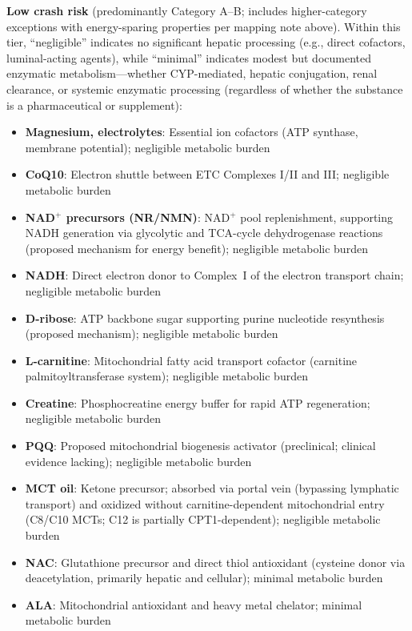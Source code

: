 \textbf{Low crash risk} (predominantly Category A--B; includes higher-category exceptions with energy-sparing properties per mapping note above). Within this tier, ``negligible'' indicates no significant hepatic processing (e.g., direct cofactors, luminal-acting agents), while ``minimal'' indicates modest but documented enzymatic metabolism---whether CYP-mediated, hepatic conjugation, renal clearance, or systemic enzymatic processing (regardless of whether the substance is a pharmaceutical or supplement):
\begin{itemize}
    \item \textbf{Magnesium, electrolytes}: Essential ion cofactors (ATP synthase, membrane potential); negligible metabolic burden
    \item \textbf{CoQ10}: Electron shuttle between ETC Complexes I/II and III; negligible metabolic burden
    \item \textbf{NAD$^+$ precursors (NR/NMN)}: NAD$^+$ pool replenishment, supporting NADH generation via glycolytic and TCA-cycle dehydrogenase reactions (proposed mechanism for energy benefit); negligible metabolic burden
    \item \textbf{NADH}: Direct electron donor to Complex~I of the electron transport chain; negligible metabolic burden
    \item \textbf{D-ribose}: ATP backbone sugar supporting purine nucleotide resynthesis (proposed mechanism); negligible metabolic burden
    \item \textbf{L-carnitine}: Mitochondrial fatty acid transport cofactor (carnitine palmitoyltransferase system); negligible metabolic burden
    \item \textbf{Creatine}: Phosphocreatine energy buffer for rapid ATP regeneration; negligible metabolic burden
    \item \textbf{PQQ}: Proposed mitochondrial biogenesis activator (preclinical; clinical evidence lacking); negligible metabolic burden
    \item \textbf{MCT oil}: Ketone precursor; absorbed via portal vein (bypassing lymphatic transport) and oxidized without carnitine-dependent mitochondrial entry (C8/C10 MCTs; C12 is partially CPT1-dependent); negligible metabolic burden
    \item \textbf{NAC}: Glutathione precursor and direct thiol antioxidant (cysteine donor via deacetylation, primarily hepatic and cellular); minimal metabolic burden
    \item \textbf{ALA}: Mitochondrial antioxidant and heavy metal chelator; minimal metabolic burden

\end{itemize}
